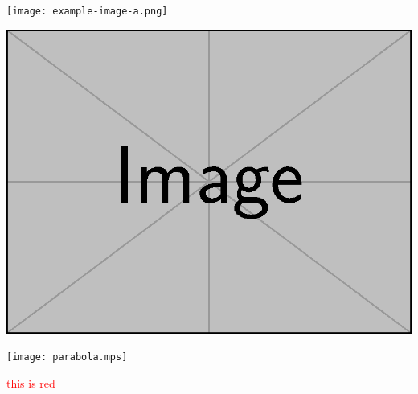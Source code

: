 \documentclass{article}
\begin{document}
\texttt{[image: example-image-a.png]}

\includegraphics{example-image.eps}

\texttt{[image: parabola.mps]}



\textcolor{red}{this is red}
\end{document}
